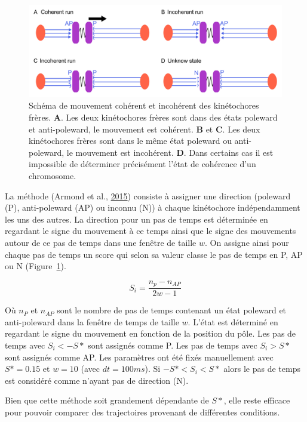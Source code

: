 \documentclass[12pt,a4paper,twoside,openright]{book}
\begin{document}
\begin{figure}[htbp]
\centering
\includegraphics{figures/results/imaging/coherence_schema.png}
\caption[Schéma de mouvement cohérent et incohérent des kinétochores frères.]{\label{fig:coherence_schema}Schéma
de mouvement cohérent et incohérent des kinétochores frères. \textbf{A}.
Les deux kinétochores frères sont dans des états poleward et
anti-poleward, le mouvement est cohérent. \textbf{B} et \textbf{C}. Les
deux kinétochores frères sont dans le même état poleward ou
anti-poleward, le mouvement est incohérent. \textbf{D}. Dans certains
cas il est impossible de déterminer précisément l'état de cohérence d'un
chromosome.}
\end{figure}

La méthode (Armond et al., \protect\hyperlink{ref-Armond2015}{2015})
consiste à assigner une direction (poleward (P), anti-poleward (AP) ou
inconnu (N)) à chaque kinétochore indépendamment les uns des autres. La
direction pour un pas de temps est déterminée en regardant le signe du
mouvement à ce temps ainsi que le signe des mouvements autour de ce pas
de temps dans une fenêtre de taille \(w\). On assigne ainsi pour chaque
pas de temps un score qui selon sa valeur classe le pas de temps en P,
AP ou N (Figure~\ref{fig:coherence_schema}).

\[
S_i = \frac{n_p - n_{AP}}{2w - 1}
\]

Où \(n_P\) et \(n_{AP}\) sont le nombre de pas de temps contenant un
état poleward et anti-poleward dans la fenêtre de temps de taille \(w\).
L'état est déterminé en regardant le signe du mouvement en fonction de
la position du pôle. Les pas de temps avec \(S_i < -S*\) sont assignés
comme P. Les pas de temps avec \(S_i > S*\) sont assignés comme AP. Les
paramètres ont été fixés manuellement avec \(S* = 0.15\) et \(w = 10\)
(avec \(dt=100ms\)). Si \(-S* < S_i < S*\) alors le pas de temps est
considéré comme n'ayant pas de direction (N).

Bien que cette méthode soit grandement dépendante de \(S*\), elle reste
efficace pour pouvoir comparer des trajectoires provenant de différentes
conditions.
\end{document}
